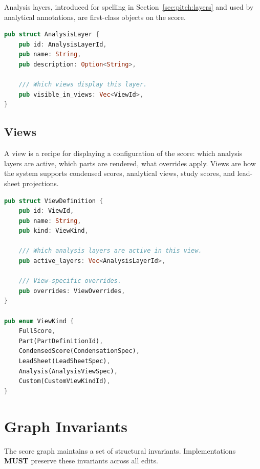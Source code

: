 \documentclass[11pt,letterpaper]{report}
\newcommand{\MUST}{\textbf{MUST}}
\begin{document}
Analysis layers, introduced for spelling in Section~\ref{sec:pitch:layers}
and used by analytical annotations, are first-class objects on the
score.

\begin{lstlisting}[language=Rust]
pub struct AnalysisLayer {
    pub id: AnalysisLayerId,
    pub name: String,
    pub description: Option<String>,

    /// Which views display this layer.
    pub visible_in_views: Vec<ViewId>,
}
\end{lstlisting}

\subsection{Views}

A view is a recipe for displaying a configuration of the score:
which analysis layers are active, which parts are rendered, what
overrides apply. Views are how the system supports condensed scores,
analytical views, study scores, and lead-sheet projections.

\begin{lstlisting}[language=Rust]
pub struct ViewDefinition {
    pub id: ViewId,
    pub name: String,
    pub kind: ViewKind,

    /// Which analysis layers are active in this view.
    pub active_layers: Vec<AnalysisLayerId>,

    /// View-specific overrides.
    pub overrides: ViewOverrides,
}

pub enum ViewKind {
    FullScore,
    Part(PartDefinitionId),
    CondensedScore(CondensationSpec),
    LeadSheet(LeadSheetSpec),
    Analysis(AnalysisViewSpec),
    Custom(CustomViewKindId),
}
\end{lstlisting}

\section{Graph Invariants}
\label{sec:graph:invariants}

The score graph maintains a set of structural invariants. Implementations
\MUST{} preserve these invariants across all edits.
\end{document}

